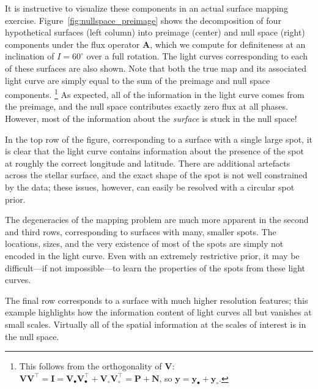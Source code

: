 \documentclass[modern]{aastex62}
\begin{document}
It is instructive to visualize these components in
an actual surface mapping exercise. Figure~\ref{fig:nullspace_preimage}
shows the decomposition of four hypothetical surfaces (left
column) into preimage (center) and null space (right)
components under the flux operator $\mathbf{A}$, which we compute for
definiteness at an inclination of $I = 60^\circ$ over a full rotation.
The light curves corresponding to each of these surfaces are also shown.
Note that both the true map and its associated light curve are simply equal to
the sum of the preimage and null space components.%
\footnote{%
    This follows from the orthogonality of $\mathbf{V}$:
    $
        \mathbf{V} \mathbf{V}^\top =
        \mathbf{I} =
        \mathbf{V}_\bullet \mathbf{V}_\bullet^\top  + \mathbf{V}_\circ \mathbf{V}_\circ^\top =
        \mathbf{P} + \mathbf{N}
    $, so $\mathbf{y} = \mathbf{y}_\bullet + \mathbf{y}_\circ$.
}
%
As expected, all of the information in the light curve comes
from the preimage, and the null space contributes exactly zero
flux at all phases. However, most of the information about the
\emph{surface} is stuck in the null space!

In the top row of the figure, corresponding to a surface with
a single large spot, it is clear that the light curve
contains information about the presence of the spot at roughly the
correct longitude and latitude. There are additional artefacts
across the stellar surface, and the exact shape of the spot is
not well constrained by the data; these issues, however, can
easily be resolved with a circular spot prior.

The degeneracies of the mapping problem are much more apparent
in the second and third rows, corresponding to surfaces with
many, smaller spots. The locations, sizes, and the very existence
of most of the spots are simply not encoded in the light curve.
Even with an extremely restrictive prior, it may be difficult---if
not impossible---to learn the properties of the spots
from these light curves.

The final row corresponds to a surface with much higher resolution
features; this example highlights how the information content of
light curves all but vanishes at small scales. Virtually all of the
spatial information at the scales of interest is in the null space.
\end{document}
